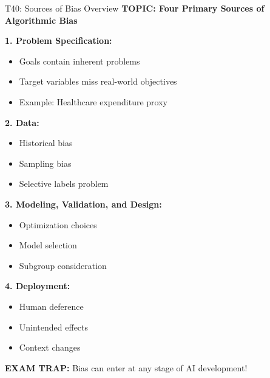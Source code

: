 \documentclass[8pt]{beamer}
\begin{document}
	\begin{frame}{T40: Sources of Bias Overview}
		\fontsize{6.5}{7.5}\selectfont
		\textbf{TOPIC: Four Primary Sources of Algorithmic Bias}
		
		\vspace{0.1cm}
		\textbf{1. Problem Specification:}
		\begin{itemize}
			\item Goals contain inherent problems
			\item Target variables miss real-world objectives
			\item Example: Healthcare expenditure proxy
		\end{itemize}
		
		\vspace{0.1cm}
		\textbf{2. Data:}
		\begin{itemize}
			\item Historical bias
			\item Sampling bias
			\item Selective labels problem
		\end{itemize}
		
		\vspace{0.1cm}
		\textbf{3. Modeling, Validation, and Design:}
		\begin{itemize}
			\item Optimization choices
			\item Model selection
			\item Subgroup consideration
		\end{itemize}
		
		\vspace{0.1cm}
		\textbf{4. Deployment:}
		\begin{itemize}
			\item Human deference
			\item Unintended effects
			\item Context changes
		\end{itemize}
		
		\textcolor{myred}{\textbf{EXAM TRAP:}} Bias can enter at \textcolor{myblue}{any stage} of AI development!
	\end{frame}
	
\end{document}

